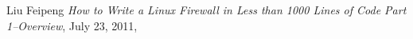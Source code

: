 \documentclass[10pt,a4paper,notitlepage]{article}
\newcommand{\myUrl}[1]{{\color{blue}{#1}}}
\begin{document}
%
%
%
%
%
\begin{thebibliography}{9}

  Liu Feipeng
  \emph{How to Write a Linux Firewall in Less than 1000 Lines of Code Part 1–Overview},
  July 23, 2011,
  \myUrl{http://www.roman10.net/a-linux-firewall-using-netfilter-part-1overview/}

\end{thebibliography}
\end{document}
